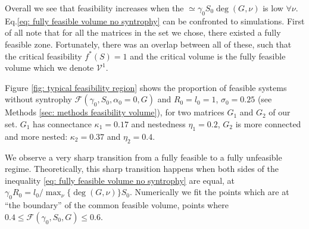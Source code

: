 \documentclass[12pt, titlepage]{report}
\begin{document}
Overall we see that feasibility increases when the  $\simeq \gamma_0 S_0 \deg(G,\nu) $ is low $\forall \nu$.
Eq.\eqref{eq: fully feasible volume no syntrophy} can be confronted to simulations. First of all note that for all the matrices in the set we chose, there existed a fully feasible zone. Fortunately, there was an overlap between all of these, such that the critical feasibility $f^*(S)=1$ and the critical volume is the fully feasible volume which we denote $\mathcal{V}^1$.

 Figure \ref{fig: typical feasibility region} shows the proportion of feasible systems without syntrophy $\mathcal{F}(\gamma_0, S_0, \alpha_0=0, G)$ and $R_0=l_0=1$, $\sigma_0=0.25$ (see Methods \ref{sec: methods feasibility volume}), for two matrices $G_1$ and $G_2$ of our set. $G_1$ has connectance $\kappa_1=0.17$ and nestedness $\eta_1=0.2$, $G_2$ is more connected and more nested: $\kappa_2=0.37$ and $\eta_2=0.4$.

We observe a very sharp transition from a fully feasible to a fully unfeasible regime. Theoretically, this sharp transition happens when both sides of the inequality \eqref{eq: fully feasible volume no syntrophy} are equal, \ie at $\gamma_0 R_0 = l_0/\max_\nu\{\deg(G,\nu)\}S_0$.
 Numerically we fit the points which are at ``the boundary'' of the common feasible volume, \ie points where $0.4 \leq \mathcal{F}(\gamma_0, S_0, G) \leq 0.6$.
\end{document}
